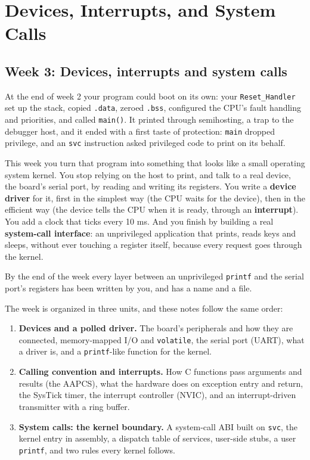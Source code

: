 \chapter{Devices, Interrupts, and System Calls}

\section*{Week 3: Devices, interrupts and system calls}

At the end of week 2 your program could boot on its own: your \texttt{Reset\_Handler} set up the stack, copied \texttt{.data}, zeroed \texttt{.bss}, configured the CPU's fault handling and priorities, and called \texttt{main()}. It printed through semihosting, a trap to the debugger host, and it ended with a first taste of protection: \texttt{main} dropped privilege, and an \texttt{svc} instruction asked privileged code to print on its behalf.

This week you turn that program into something that looks like a small operating system kernel. You stop relying on the host to print, and talk to a real device, the board's serial port, by reading and writing its registers. You write a \textbf{device driver} for it, first in the simplest way (the CPU waits for the device), then in the efficient way (the device tells the CPU when it is ready, through an \textbf{interrupt}). You add a clock that ticks every 10 ms. And you finish by building a real \textbf{system-call interface}: an unprivileged application that prints, reads keys and sleeps, without ever touching a register itself, because every request goes through the kernel.

By the end of the week every layer between an unprivileged \texttt{printf} and the serial port's registers has been written by you, and has a name and a file.

The week is organized in three units, and these notes follow the same order:

\begin{enumerate}
    \item \textbf{Devices and a polled driver.} The board's peripherals and how they are connected, memory-mapped I/O and \texttt{volatile}, the serial port (UART), what a driver is, and a \texttt{printf}-like function for the kernel.
    \item \textbf{Calling convention and interrupts.} How C functions pass arguments and results (the AAPCS), what the hardware does on exception entry and return, the SysTick timer, the interrupt controller (NVIC), and an interrupt-driven transmitter with a ring buffer.
    \item \textbf{System calls: the kernel boundary.} A system-call ABI built on \texttt{svc}, the kernel entry in assembly, a dispatch table of services, user-side stubs, a user \texttt{printf}, and two rules every kernel follows.
\end{enumerate}

